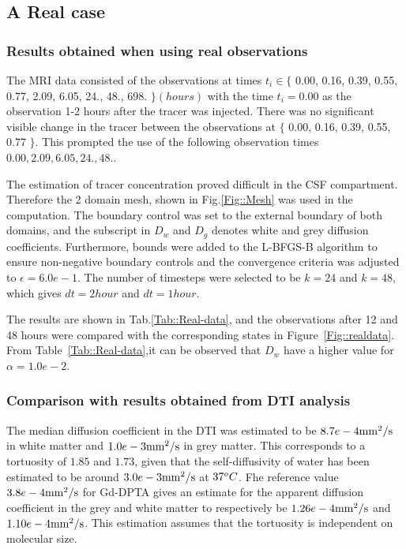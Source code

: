 \documentclass[11pt,a4paper]{article}
\begin{document}
\subsection{A Real case} 

\subsubsection{Results obtained when using real observations}
The MRI data consisted of the observations at times $t_i \in \lbrace$ 0.00, 0.16, 0.39, 0.55, 0.77, 2.09, 6.05, 24., 48., 698. $\rbrace (hours)$ with the time $t_i=0.00$ as the observation 1-2 hours after the tracer was injected. There was no significant visible change in the tracer between the observations at $\lbrace $ 0.00, 0.16, 0.39, 0.55, 0.77 $ \rbrace$. This prompted the use of the following observation times  $0.00, 2.09, 6.05, 24., 48.$. 

The estimation of tracer concentration proved difficult in the CSF compartment. Therefore the 2 domain mesh, shown in Fig.\ref{Fig::Mesh} was used in the computation. The boundary control was set to the external boundary of both domains, and the subscript in $D_w$ and $D_g$ denotes white and grey diffusion coefficients. Furthermore, bounds were added to the L-BFGS-B algorithm to ensure non-negative boundary controls and the convergence criteria was adjusted to $\epsilon=6.0e-1$. The number of timesteps were selected to be $k=24$ and $k=48$, which gives $dt = 2 hour$ and $dt = 1 hour$.   

The results are shown in Tab.\ref{Tab::Real-data}, and the observations after 12 and 48 hours were compared with the corresponding states in Figure~\ref{Fig::realdata}. From Table~\ref{Tab::Real-data},it can be observed that $D_w$ have a higher value for $\alpha =1.0e-2$.

\subsubsection{Comparison with results obtained from DTI analysis}

The median diffusion coefficient in the DTI was estimated to be $8.7e-4 \mathrm{mm\sp{2}/s}$ in white matter and $1.0e-3 \mathrm{mm\sp{2}/s}$ in grey matter. This corresponds to a tortuosity of $1.85$ and $1.73$, given that the self-diffusivity of water has been estimated to be around $3.0e-3\mathrm{mm\sp{2}/s}$ at $37\sp{o}C$. Fhe reference value $3.8e-4 \mathrm{mm\sp{2}/s}$ for Gd-DPTA gives an estimate for the apparent diffusion coefficient in the grey and white matter to respectively be $ 1.26e-4\mathrm{mm\sp{2}/s}$ and $1.10e-4 \mathrm{mm\sp{2}/s}$. This estimation assumes that the tortuosity is independent on molecular size. 
\end{document}
